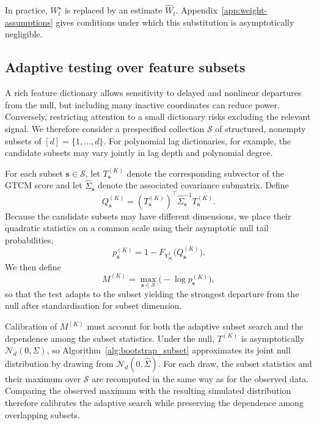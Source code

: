 \documentclass[12pt]{article}
\numberwithin{equation}{section}
\begin{document}
In practice, \(W_t^\star\) is replaced by an estimate \(\hat W_t\).
Appendix~\ref{app:weight-assumptions} gives conditions under which this
substitution is asymptotically negligible.


\subsection{Adaptive testing over feature subsets}
\label{subsec:max_statistic}

A rich feature dictionary allows sensitivity to delayed and nonlinear departures from the null, but including many inactive coordinates can reduce power. Conversely, restricting attention to a small dictionary risks excluding the relevant signal. We therefore consider a prespecified collection \(\mathcal S\) of structured, nonempty subsets of \([d]=\{1,\ldots,d\}\). For polynomial lag dictionaries, for example, the candidate subsets may vary jointly in lag depth and polynomial degree.

For each subset $\pmb{s}\in\mathcal S$, let $T_{\pmb{s}}^{(K)}$ denote the corresponding subvector of the GTCM score and let $\hat\Sigma_{\pmb{s}}$ denote the associated covariance submatrix. Define
\begin{equation}
    Q_{\pmb{s}}^{(K)}
    =
    (T_{\pmb{s}}^{(K)})^\top
    \hat\Sigma_{\pmb{s}}^{-1}
    T_{\pmb{s}}^{(K)} .
\end{equation}
Because the candidate subsets may have different dimensions, we place their quadratic statistics on a common scale using their asymptotic null tail probabilities,
\begin{equation}
    p_{\pmb{s}}^{(K)}
    = 1-
    F_{\chi^2_{|\pmb{s}|}}
    \big(
        Q_{\pmb{s}}^{(K)}
    \big).
\end{equation}
We then define
\begin{equation}
    M^{(K)}
    =
    \max_{\pmb{s}\in\mathcal S}
    \big(-\log p_{\pmb{s}}^{(K)}\big),
    \label{eq:max_evidence_stat}
\end{equation}
so that the test adapts to the subset yielding the strongest departure from the null after standardisation for subset dimension.

Calibration of \(M^{(K)}\) must account for both the adaptive subset search and the dependence among the subset statistics. Under the null, \(T^{(K)}\) is asymptotically \(\mathcal N_d(0,\Sigma)\), so Algorithm~\ref{alg:bootstrap_subset} approximates its joint null distribution by drawing from \(\mathcal N_d(0,\hat\Sigma)\). For each draw, the subset statistics and their maximum over \(\mathcal S\) are recomputed in the same way as for the observed data. Comparing the observed maximum with the resulting simulated distribution therefore calibrates the adaptive search while preserving the dependence among overlapping subsets.
\end{document}
